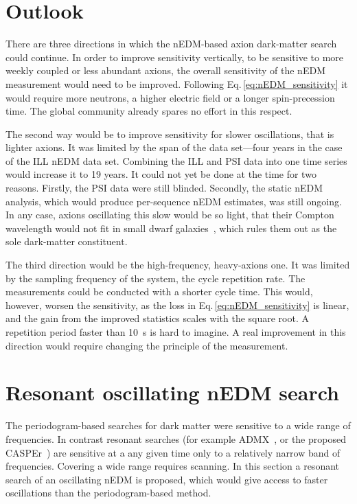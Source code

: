 \section{Outlook}
There are three directions in which the nEDM-based axion dark-matter search could continue.
In order to improve sensitivity vertically, to be sensitive to more weekly coupled or less abundant axions, the overall sensitivity of the nEDM measurement would need to be improved.
Following Eq.\,\ref{eq:nEDM_sensitivity} it would require more neutrons, a higher electric field or a longer spin-precession time.
The global community already spares no effort in this respect.

The second way would be to improve sensitivity for slower oscillations, that is  lighter axions.
It was limited by the span of the data set---four years in the case of the ILL nEDM data set.
Combining the ILL and PSI data into one time series would increase it to 19 years.
It could not yet be done at the time for two reasons.
Firstly, the PSI data were still blinded.
Secondly, the static nEDM analysis, which would produce per-sequence nEDM estimates, was still ongoing.
In any case, axions oscillating this slow would be so light, that their Compton wavelength would not fit in small dwarf galaxies~\cite{Marsh2015Review}, which rules them out as the sole dark-matter constituent.

The third direction would be the high-frequency, heavy-axions one.
It was limited by the sampling frequency of the system, the cycle repetition rate.
The measurements could be conducted with a shorter cycle time.
This would, however, worsen the sensitivity, as the loss in Eq.\,\ref{eq:nEDM_sensitivity} is linear, and the gain from the improved statistics scales with the square root.
A repetition period faster than \SI{10}{\second} is hard to imagine.
A real improvement in this direction would require changing the principle of the measurement.




\section{Resonant oscillating nEDM search}
The periodogram-based searches for dark matter were sensitive to a wide range of frequencies.
In contrast resonant searches (for example ADMX~\cite{PhysRevLett.104.041301}, or the proposed CASPEr~\cite{CASPEr2014}) are sensitive at a any given time only to a relatively narrow band of frequencies.
Covering a wide range requires scanning.
In this section a resonant search of an oscillating nEDM is proposed, which would give access to faster oscillations than the periodogram-based method.


